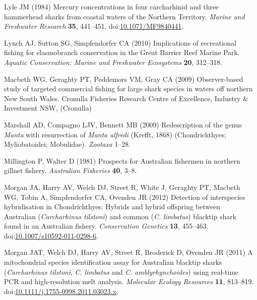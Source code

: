 \documentclass[]{article}
\begin{document}
\hypertarget{ref-lyle_mercury_1984}{}
Lyle JM (1984) Mercury concentrations in four carcharhinid and three
hammerhead sharks from coastal waters of the Northern Territory.
\emph{Marine and Freshwater Research} \textbf{35}, 441--451.
doi:\href{https://doi.org/10.1071/MF9840441}{10.1071/MF9840441}.

\hypertarget{ref-lynch_implications_2010}{}
Lynch AJ, Sutton SG, Simpfendorfer CA (2010) Implications of
recreational fishing for elasmobranch conservation in the Great Barrier
Reef Marine Park. \emph{Aquatic Conservation: Marine and Freshwater
Ecosystems} \textbf{20}, 312--318.

\hypertarget{ref-macbeth_observer-based_2009}{}
Macbeth WG, Geraghty PT, Peddemors VM, Gray CA (2009) Observer-based
study of targeted commercial fishing for large shark species in waters
off northern New South Wales. Cronulla Fisheries Research Centre of
Excellence, Industry \& Investment NSW, (Cronulla)

\hypertarget{ref-marshall_redescription_2009}{}
Marshall AD, Compagno LJV, Bennett MB (2009) Redescription of the genus
\emph{Manta} with resurrection of \emph{Manta alfredi} (Krefft, 1868)
(Chondrichthyes; Myliobatoidei; Mobulidae). \emph{Zootaxa} 1--28.

\hypertarget{ref-millington_prospects_1981}{}
Millington P, Walter D (1981) Prospects for Australian fishermen in
northern gillnet fishery. \emph{Australian Fisheries} \textbf{40}, 3--8.

\hypertarget{ref-morgan_detection_2012}{}
Morgan JA, Harry AV, Welch DJ, Street R, White J, Geraghty PT, Macbeth
WG, Tobin A, Simpfendorfer CA, Ovenden JR (2012) Detection of
interspecies hybridisation in Chondrichthyes: Hybrids and hybrid
offspring between Australian (\emph{Carcharhinus tilstoni}) and common
(\emph{C. limbatus}) blacktip shark found in an Australian fishery.
\emph{Conservation Genetics} \textbf{13}, 455--463.
doi:\href{https://doi.org/10.1007/s10592-011-0298-6}{10.1007/s10592-011-0298-6}.

\hypertarget{ref-morgan_mitochondrial_2011}{}
Morgan JAT, Welch DJ, Harry AV, Street R, Broderick D, Ovenden JR (2011)
A mitochondrial species identification assay for Australian blacktip
sharks (\emph{Carcharhinus tilstoni}, \emph{C. limbatus} and \emph{C.
amblyrhynchoides}) using real-time PCR and high-resolution melt
analysis. \emph{Molecular Ecology Resources} \textbf{11}, 813--819.
doi:\href{https://doi.org/10.1111/j.1755-0998.2011.03023.x}{10.1111/j.1755-0998.2011.03023.x}.
\end{document}
